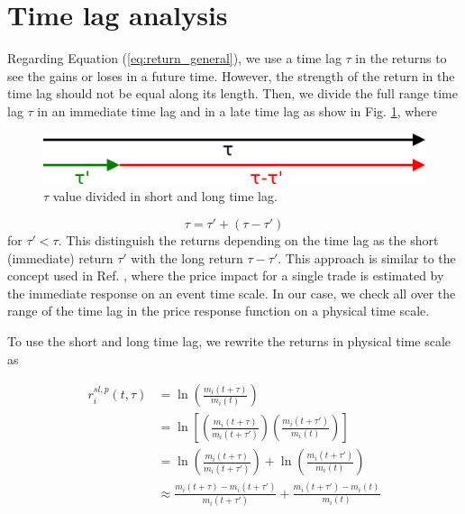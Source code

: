 \section{Time lag analysis}\label{sec:short_long}

Regarding Equation (\ref{eq:return_general}), we use a time lag $\tau$ in the
returns to see the gains or loses in a future time. However, the strength of
the return in the time lag should not be equal along its length. Then, we
divide the full range time lag $\tau$ in an immediate time lag and in a late
time lag as show in Fig. \ref{fig:tau_short_long}, where

\begin{figure}[htbp]
    \centering
    \includegraphics[width=\columnwidth]{figures/05_tau_short_long.png}
    \caption{$\tau$ value divided in short and long time lag.}
    \label{fig:tau_short_long}
\end{figure}

\begin{equation}\label{eq:tau_short_long}
    \tau = \tau' + \left( \tau - \tau' \right)
\end{equation}
for $\tau' < \tau$. This distinguish the returns depending on the time lag as
the short (immediate) return $\tau'$ with the long return $\tau - \tau'$.
This approach is similar to the concept used in Ref. \cite{Wang_2018_b}, where
the price impact for a single trade is estimated by the immediate response on
an event time scale. In our case, we check all over the range of the time lag
in the price response function on a physical time scale.

To use the short and long time lag, we rewrite the returns in physical time
scale as

\begin{align}\label{eq:short_long_return}
    r^{sl,p}_{i}\left(t,\tau\right)&=\ln\left(\frac{m_{i}\left(t+\tau\right)}
    {m_{i} \left(t\right)}\right) \nonumber \\
    &=\ln\left[\left(\frac{m_{i}\left(t+\tau\right)}{m_{i}\left(t+\tau'\right)}
    \right)
    \left(\frac{m_{i} \left(t+\tau'\right)}{m_{i}\left(t\right)}\right)\right]
    \nonumber \\
    &=\ln\left(\frac{m_{i}\left(t+\tau\right)}{m_{i}\left(t+\tau'\right)}
    \right)+ \ln\left(\frac{m_{i}\left(t+\tau'\right)}{m_{i}\left(t\right)}
    \right)\nonumber \\
    &\approx\frac{m_{i}\left(t+\tau\right)-m_{i}\left(t+\tau'\right)}
    {m_{i}\left(t+\tau'\right)} +\frac{m_{i}\left(t+\tau'\right)-m_{i}
    \left(t\right)}{m_{i}\left(t\right)}
\end{align}


